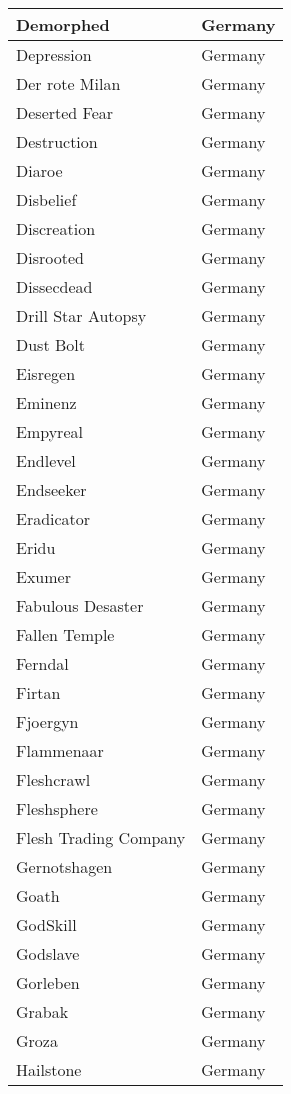 \documentclass[12pt, a4paper, twoside]{report}
\begin{document}
\begin{center}
\begin{longtable}{|p{5cm}|p{5cm}|}
Demorphed & Germany \\ \hline
Depression & Germany \\ \hline
Der rote Milan & Germany \\ \hline
Deserted Fear & Germany \\ \hline
Destruction & Germany \\ \hline
Diaroe & Germany \\ \hline
Disbelief & Germany \\ \hline
Discreation & Germany \\ \hline
Disrooted & Germany \\ \hline
Dissecdead & Germany \\ \hline
Drill Star Autopsy & Germany \\ \hline
Dust Bolt & Germany \\ \hline
Eisregen & Germany \\ \hline
Eminenz & Germany \\ \hline
Empyreal & Germany \\ \hline
Endlevel & Germany \\ \hline
Endseeker & Germany \\ \hline
Eradicator & Germany \\ \hline
Eridu & Germany \\ \hline
Exumer & Germany \\ \hline
Fabulous Desaster & Germany \\ \hline
Fallen Temple & Germany \\ \hline
Ferndal & Germany \\ \hline
Firtan & Germany \\ \hline
Fjoergyn & Germany \\ \hline
Flammenaar & Germany \\ \hline
Fleshcrawl & Germany \\ \hline
Fleshsphere & Germany \\ \hline
Flesh Trading Company & Germany \\ \hline
Gernotshagen & Germany \\ \hline
Goath & Germany \\ \hline
GodSkill & Germany \\ \hline
Godslave & Germany \\ \hline
Gorleben & Germany \\ \hline
Grabak & Germany \\ \hline
Groza & Germany \\ \hline
Hailstone & Germany \\ \hline

\end{longtable}
\end{center}
\end{document}
